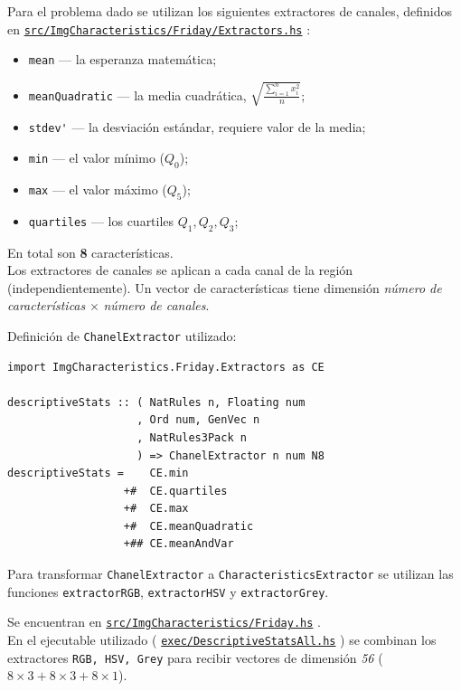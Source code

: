 \documentclass{article}
\newcommand\refcode[2]{ \href{#1}{\texttt{#2}} }
\begin{document}
Para el problema dado se utilizan los siguientes extractores de canales, definidos en \refcode{\Extractors}{src/ImgCharacteristics/Friday/Extractors.hs}:
\begin{itemize}
\item \verb|mean| --- la esperanza matemática;
\item \verb|meanQuadratic| --- la media cuadrática, $\sqrt{\frac{\sum\limits_{i=1}^n x_i^2}{n}}$;
\item \verb|stdev'| --- la desviación estándar, requiere valor de la media;
\item \verb|min| --- el valor mínimo ($Q_0$);
\item \verb|max| --- el valor máximo ($Q_5$);
\item \verb|quartiles| --- los cuartiles $Q_1, Q_2, Q_3$;
\end{itemize}

En total son \textbf{8} características. \\

\noindent Los extractores de canales se aplican a cada canal de la región (independientemente). Un vector de características tiene dimensión \emph{número de características} $\times$ \emph{número de canales}.

\medskip

\noindent Definición de \verb|ChanelExtractor| utilizado:
\begin{lstlisting}
import ImgCharacteristics.Friday.Extractors as CE

descriptiveStats :: ( NatRules n, Floating num
                    , Ord num, GenVec n
                    , NatRules3Pack n
                    ) => ChanelExtractor n num N8
descriptiveStats =    CE.min
                  +#  CE.quartiles
                  +#  CE.max
                  +#  CE.meanQuadratic
                  +## CE.meanAndVar
\end{lstlisting}

\medskip

Para transformar \verb|ChanelExtractor| a \verb|CharacteristicsExtractor| se utilizan las funciones \verb|extractorRGB|, \verb|extractorHSV| y \verb|extractorGrey|.

Se encuentran en \refcode{\Friday}{src/ImgCharacteristics/Friday.hs}.\\

En el ejecutable utilizado (\refcode{\ExecAll}{exec/DescriptiveStatsAll.hs}) se combinan los extractores \verb|RGB, HSV, Grey| para recibir vectores de dimensión \emph{56} ($8\times3 + 8\times3 + 8\times1$).
\end{document}
